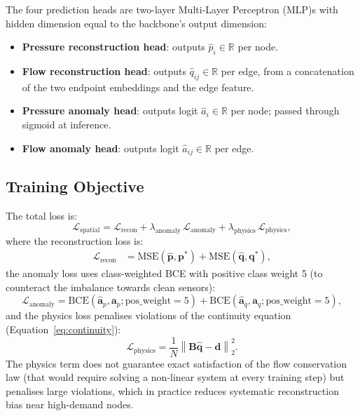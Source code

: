 The four prediction heads are two-layer Multi-Layer Perceptron (MLP)s with
hidden dimension equal to the backbone's output dimension:
\begin{itemize}
  \item \textbf{Pressure reconstruction head}: outputs
    $\hat{p}_i \in \mathbb{R}$ per node.
  \item \textbf{Flow reconstruction head}: outputs
    $\hat{q}_{ij} \in \mathbb{R}$ per edge, from a concatenation of
    the two endpoint embeddings and the edge feature.
  \item \textbf{Pressure anomaly head}: outputs logit
    $\hat{a}_i \in \mathbb{R}$ per node; passed through sigmoid at
    inference.
  \item \textbf{Flow anomaly head}: outputs logit
    $\hat{a}_{ij} \in \mathbb{R}$ per edge.
\end{itemize}

\subsection{Training Objective}

The total loss is:
\begin{equation}
  \mathcal{L}_\text{spatial} = \mathcal{L}_\text{recon}
    + \lambda_\text{anomaly}\,\mathcal{L}_\text{anomaly}
    + \lambda_\text{physics}\,\mathcal{L}_\text{physics},
\end{equation}
where the reconstruction loss is:
\begin{align}
  \mathcal{L}_\text{recon} &= \mathrm{MSE}(\hat{\mathbf{p}},
    \mathbf{p}^*) + \mathrm{MSE}(\hat{\mathbf{q}}, \mathbf{q}^*),
\end{align}
the anomaly loss uses class-weighted BCE with positive
class weight 5 (to counteract the imbalance towards clean sensors):
\begin{equation}
  \mathcal{L}_\text{anomaly} = \mathrm{BCE}(\hat{\mathbf{a}}_p,
    \mathbf{a}_p; \text{pos\_weight}=5)
    + \mathrm{BCE}(\hat{\mathbf{a}}_q, \mathbf{a}_q; \text{pos\_weight}=5),
\end{equation}
and the physics loss penalises violations of the continuity equation
(Equation~\ref{eq:continuity}):
\begin{equation}
  \mathcal{L}_\text{physics} =
    \frac{1}{N}\left\|\mathbf{B}\hat{\mathbf{q}} - \mathbf{d}\right\|_2^2.
\end{equation}
The physics term does not guarantee exact satisfaction of the flow
conservation law (that would require solving a non-linear system at
every training step) but penalises large violations, which in
practice reduces systematic reconstruction bias near high-demand
nodes.

